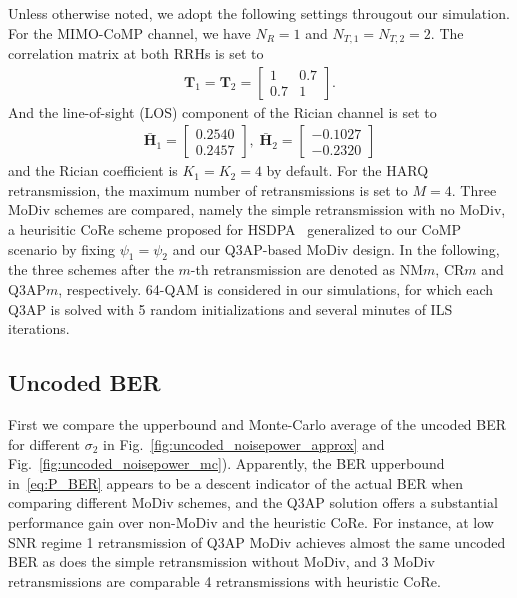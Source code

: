 \documentclass[journal,draftcls,onecolumn,12pt,twoside]{IEEEtran}
\begin{document}
Unless otherwise noted, we adopt the following settings througout our
simulation. For the MIMO-CoMP channel, we have $N_R=1$ and $N_{T, 1} = N_{T, 2}
= 2$. The correlation matrix at both RRHs is set to
\begin{align}
  \mathbf{T}_1 = \mathbf{T}_2 = \left[
    \begin{array}{cc}
      1 & 0.7 \\
      0.7 & 1 
    \end{array}
  \right].
\end{align}
And the line-of-sight (LOS) component of the Rician channel is set to
\begin{align}
  \bar{\mathbf{H}}_{1} = \left[
    \begin{array}{c}
      0.2540  \\
      0.2457
    \end{array}
  \right],\;
  \bar{\mathbf{H}}_{2} = \left[
    \begin{array}{c}
      -0.1027  \\
      -0.2320
    \end{array}
  \right]
\end{align}
and the Rician coefficient is $K_1 = K_2 = 4$ by default.
For the HARQ retransmission, the maximum number of retransmissions is set to
$M=4$. Three MoDiv schemes are compared, namely the simple retransmission with
no MoDiv, a heurisitic CoRe scheme proposed for
HSDPA~\cite{panasonic2001enhanced} generalized to our CoMP scenario by fixing
$\psi_1 = \psi_2$ and our Q3AP-based MoDiv design. In the following, the three schemes after the $m$-th retransmission are denoted
as NM$m$, CR$m$ and Q3AP$m$, respectively. 64-QAM is considered in our
simulations, for which each Q3AP is solved with 5 random initializations and
several minutes of ILS iterations.

\subsection{Uncoded BER}
First we compare the upperbound and Monte-Carlo average of the uncoded BER for
different $\sigma_2$ in Fig.~\ref{fig:uncoded_noisepower_approx} and 
Fig.~\ref{fig:uncoded_noisepower_mc}).
Apparently, the BER upperbound in~\eqref{eq:P_BER} appears to be a descent
indicator of the actual BER when comparing different MoDiv schemes, and the Q3AP
solution offers a substantial performance gain over non-MoDiv and the heuristic CoRe. For
instance, at low SNR regime 1 retransmission of Q3AP MoDiv achieves almost the
same uncoded BER as does the simple retransmission without MoDiv, and 3 MoDiv
retransmissions are comparable 4 retransmissions with heuristic CoRe.
\end{document}
